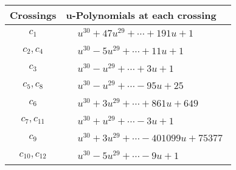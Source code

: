 \documentclass[1p]{elsarticle_modified}
\theoremstyle{definition}
\begin{document}
\begin{tabular}{m{50pt}|m{274pt}}
Crossings & \hspace{64pt}u-Polynomials at each crossing \\
\hline $$\begin{aligned}c_{1}\end{aligned}$$&$\begin{aligned}
&u^{30}+47 u^{29}+\cdots+191 u+1
\end{aligned}$\\
\hline $$\begin{aligned}c_{2},c_{4}\end{aligned}$$&$\begin{aligned}
&u^{30}-5 u^{29}+\cdots+11 u+1
\end{aligned}$\\
\hline $$\begin{aligned}c_{3}\end{aligned}$$&$\begin{aligned}
&u^{30}- u^{29}+\cdots+3 u+1
\end{aligned}$\\
\hline $$\begin{aligned}c_{5},c_{8}\end{aligned}$$&$\begin{aligned}
&u^{30}- u^{29}+\cdots-95 u+25
\end{aligned}$\\
\hline $$\begin{aligned}c_{6}\end{aligned}$$&$\begin{aligned}
&u^{30}+3 u^{29}+\cdots+861 u+649
\end{aligned}$\\
\hline $$\begin{aligned}c_{7},c_{11}\end{aligned}$$&$\begin{aligned}
&u^{30}+u^{29}+\cdots-3 u+1
\end{aligned}$\\
\hline $$\begin{aligned}c_{9}\end{aligned}$$&$\begin{aligned}
&u^{30}+3 u^{29}+\cdots-401099 u+75377
\end{aligned}$\\
\hline $$\begin{aligned}c_{10},c_{12}\end{aligned}$$&$\begin{aligned}
&u^{30}-5 u^{29}+\cdots-9 u+1
\end{aligned}$\\
\hline
\end{tabular}\\~\\
\end{document}
